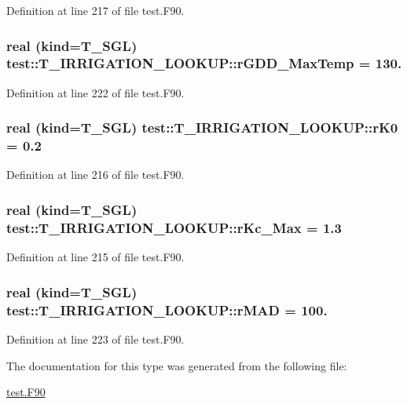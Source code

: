 Definition at line 217 of file test.F90.

\hypertarget{typetest_1_1_t___i_r_r_i_g_a_t_i_o_n___l_o_o_k_u_p_a16e0ba91ffd650d0da0324c81fc015ed}{
\subsubsection[{rGDD\_\-MaxTemp}]{\setlength{\rightskip}{0pt plus 5cm}real (kind={\bf T\_\-SGL}) {\bf test::T\_\-IRRIGATION\_\-LOOKUP::rGDD\_\-MaxTemp} = 130.}}
\label{typetest_1_1_t___i_r_r_i_g_a_t_i_o_n___l_o_o_k_u_p_a16e0ba91ffd650d0da0324c81fc015ed}


Definition at line 222 of file test.F90.

\hypertarget{typetest_1_1_t___i_r_r_i_g_a_t_i_o_n___l_o_o_k_u_p_a9a020d19d59cfb1c70ede5f2585a96b9}{
\subsubsection[{rK0}]{\setlength{\rightskip}{0pt plus 5cm}real (kind={\bf T\_\-SGL}) {\bf test::T\_\-IRRIGATION\_\-LOOKUP::rK0} = 0.2}}
\label{typetest_1_1_t___i_r_r_i_g_a_t_i_o_n___l_o_o_k_u_p_a9a020d19d59cfb1c70ede5f2585a96b9}


Definition at line 216 of file test.F90.

\hypertarget{typetest_1_1_t___i_r_r_i_g_a_t_i_o_n___l_o_o_k_u_p_a6088f666eae6835f54d34ab87b1b2091}{
\subsubsection[{rKc\_\-Max}]{\setlength{\rightskip}{0pt plus 5cm}real (kind={\bf T\_\-SGL}) {\bf test::T\_\-IRRIGATION\_\-LOOKUP::rKc\_\-Max} = 1.3}}
\label{typetest_1_1_t___i_r_r_i_g_a_t_i_o_n___l_o_o_k_u_p_a6088f666eae6835f54d34ab87b1b2091}


Definition at line 215 of file test.F90.

\hypertarget{typetest_1_1_t___i_r_r_i_g_a_t_i_o_n___l_o_o_k_u_p_a835f1006468f43dbf4973538c87e609f}{
\subsubsection[{rMAD}]{\setlength{\rightskip}{0pt plus 5cm}real (kind={\bf T\_\-SGL}) {\bf test::T\_\-IRRIGATION\_\-LOOKUP::rMAD} = 100.}}
\label{typetest_1_1_t___i_r_r_i_g_a_t_i_o_n___l_o_o_k_u_p_a835f1006468f43dbf4973538c87e609f}


Definition at line 223 of file test.F90.



The documentation for this type was generated from the following file:\begin{DoxyCompactItemize}
\item 
\hyperlink{test_8_f90}{test.F90}\end{DoxyCompactItemize}
